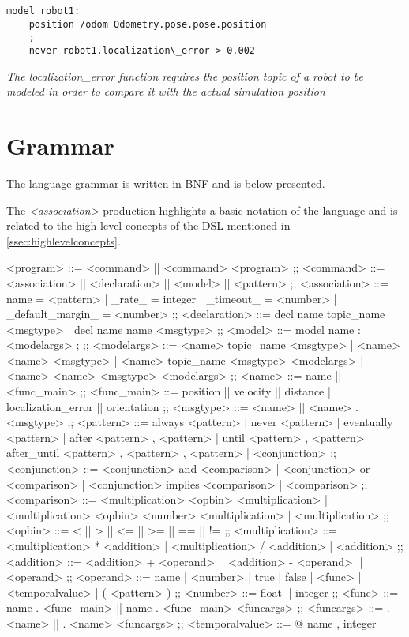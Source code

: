 \begin{lstlisting}
model robot1:
    position /odom Odometry.pose.pose.position
    ;
    never robot1.localization\_error > 0.002
\end{lstlisting}

\textit{The localization\_error function requires the position topic of a robot to be modeled in order to compare it with the actual simulation position}

\section{Grammar}
\label{sec:grammar}

The language grammar is written in BNF and is below presented.

The \textit{<association>} production highlights a basic notation of the language and is related to the high-level concepts of the DSL mentioned in \autoref{ssec:highlevelconcepts}.

\begin{bnfgrammar}
    <program> %
    ::=
    <command> || <command> <program>
    ;;
    <command> ::=
    <association>
    || <declaration>
    || <model>
    || <pattern>
    ;; 
    <association> ::=
    name = <pattern>
    | \_rate\_ = integer
    | \_timeout\_ = <number>
    | \_default\_margin\_ = <number>
    ;;
    <declaration> ::=
    decl name topic\_name <msgtype>
    | decl name name <msgtype>
    ;;
    <model> ::= 
    model name $\colon$ <modelargs> ;
    ;;
    <modelargs> ::= 
    <name> topic\_name <msgtype>
    | <name> <name> <msgtype>
    | <name> topic\_name <msgtype> <modelargs>
    | <name> <name> <msgtype> <modelargs>
    ;;
    <name> ::= 
    name || <func\_main>
    ;;
    <func\_main> ::= 
    position
    || velocity
    || distance
    || localization\_error
    || orientation
    ;;
    <msgtype> ::= 
    <name> || <name> . <msgtype>
    ;;
    <pattern> ::= 
    always <pattern>
    | never <pattern>
    | eventually <pattern>
    | after <pattern> , <pattern>
    | until <pattern> , <pattern>
    | after\_until <pattern> , <pattern> , <pattern>
    | <conjunction>
    ;;
    <conjunction> ::= 
    <conjunction> and <comparison>
    | <conjunction> or <comparison>
    | <conjunction> implies <comparison>
    | <comparison>
    ;;
    <comparison> ::= 
    <multiplication> <opbin> <multiplication>
    | <multiplication> <opbin> { <number> } <multiplication>
    | <multiplication>
    ;;
    <opbin> ::= 
    < || > || <= || >= || == || !=
    ;;
    <multiplication> ::= 
    <multiplication> * <addition>
    | <multiplication> / <addition>
    | <addition>
    ;;
    <addition> ::= <addition> + <operand>
    || <addition> - <operand>
    || <operand>
    ;;
    <operand> ::= 
    name | <number> | true | false | <func> | <temporalvalue> | ( <pattern> )
    ;;
    <number> ::= 
    float || integer
    ;;
    <func> ::= 
    name . <func\_main>
    || name . <func\_main> <funcargs>
    ;;
    <funcargs> ::= 
    . <name> || . <name> <funcargs>
    ;;
    <temporalvalue> ::= 
    @ { name , integer }
\end{bnfgrammar}


